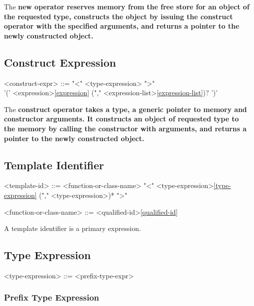 \documentclass[a4paper,oneside,11pt]{article}
\begin{document}
The \bf{new} operator reserves memory from the free store for an object of the requested type,
constructs the object by issuing the \bf{construct} operator with the specified arguments,
and returns a pointer to the newly constructed object.

\subsection{Construct Expression}

\begin{grammar}
\label{construct-expr}<construct-expr> ::=  "<" <type-expression> ">"\\
'(' <expression>\ref{expression} ("," <expression-list>\ref{expression-list})? ')'

\end{grammar}

The \bf{construct} operator takes a type, a generic pointer to memory and constructor arguments.
It constructs an object of requested type to the memory by calling the constructor with arguments,
and returns a pointer to the newly constructed object.

\subsection{Template Identifier}\label{sec:templateid}
\begin{grammar}
\label{template-id}<template-id> ::= <function-or-class-name> "<" <type-expression>\ref{type-expression} ("," <type-expression>)* ">"

<function-or-class-name> ::= <qualified-id>\ref{qualified-id}
\end{grammar}

A template identifier is a primary expression.

\subsection{Type Expression}\label{sec:typeexpr}

\begin{grammar}
\label{type-expression}<type-expression> ::= <prefix-type-expr>
\end{grammar}

\subsubsection{Prefix Type Expression}
\end{document}
